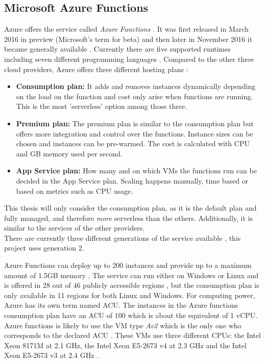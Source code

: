 \subsection{Microsoft Azure Functions}

Azure offers the service called \textit{Azure Functions} \cite{AzureFunctions}. It was first released in March 2016 in preview (Microsoft's term for beta) and then later in November 2016 it became generally available \cite{AzureFunctionsAnnouncement}. Currently there are five supported runtimes including seven different programming languages \cite{AzureFunctionsLanguages}.
Compared to the other three cloud providers, Azure offers three different hosting plans \cite{AzureFunctionsPlans}:
\begin{itemize}
\item[] \textbf{Consumption plan:} It adds and removes instances dynamically depending on the load on the function and cost only arise when functions are running. This is the most 'serverless' option among those three.
\item[] \textbf{Premium plan:} The premium plan is similar to the consumption plan but offers more integration and control over the functions. Instance sizes can be chosen and instances can be pre-warmed. The cost is calculated with \gls{CPU} and \gls{GB} memory used per second.
\item[] \textbf{App Service plan:} How many and on which \gls{VM}s the functions run can be decided in the App Service plan. Scaling happens manually, time based or based on metrics such as \gls{CPU} usage.
\end{itemize}
This thesis will only consider the consumption plan, as it is the default plan and fully managed, and therefore \textit{more} serverless than the others. Additionally, it is similar to the services of the other providers.\\
There are currently three different generations of the service available \cite{AzureFunctionsGenerations}, this project uses generation 2.

Azure Functions can deploy up to 200 instances and provide up to a maximum amount of 1.5GB memory \cite{AzureFunctionsPlans}. The service can run either on Windows or Linux and is offered in 28 out of 46 publicly accessible regions \cite{AzureRegions}, but the consumption plan is only available in 11 regions for both Linux and Windows. For computing power, Azure has its own term named \gls{ACU}. The instances in the Azure functions consumption plan have an \gls{ACU} of 100 which is about the equivalent of 1 \gls{vCPU}. Azure functions is likely to use the \gls{VM} type \textit{Av2} which is the only one who corresponds to the declared \gls{ACU} \cite{AzureFunctionsVMs}. These \gls{VM}s use three different \gls{CPU}s: the Intel Xeon 8171M at 2.1 \gls{GHz}, the Intel Xeon E5-2673 v4 at 2.3 \gls{GHz} and the Intel Xeon E5-2673 v3 at 2.4 \gls{GHz} \cite{AzureFunctionsVMs}.

